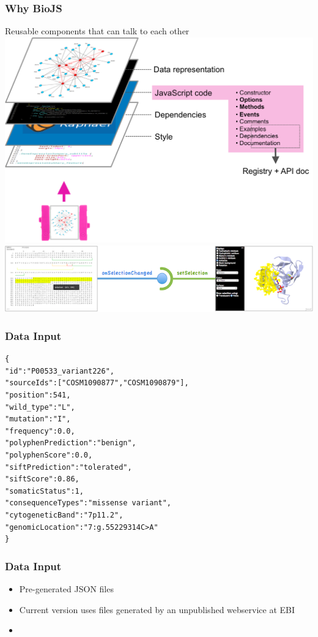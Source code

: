 \documentclass[10pt, compress]{beamer}
\renewcommand{\(}{\begin{columns}}
\renewcommand{\)}{\end{columns}}
\newcommand{\<}[1]{\begin{column}{#1}}
\renewcommand{\>}{\end{column}}
\begin{document}
\begin{frame}
\frametitle{Why BioJS}
Reusable components that can talk to each other
\includegraphics[scale=0.15]{images/biojs_component_layers}\\
\includegraphics[width=\linewidth]{images/biojs_events}
\end{frame}




\begin{frame}[fragile]
\frametitle{Data Input}
\begin{verbatim}
{
"id":"P00533_variant226",
"sourceIds":["COSM1090877","COSM1090879"],
"position":541,
"wild_type":"L",
"mutation":"I",
"frequency":0.0,
"polyphenPrediction":"benign",
"polyphenScore":0.0,
"siftPrediction":"tolerated",
"siftScore":0.86,
"somaticStatus":1,
"consequenceTypes":"missense variant",
"cytogeneticBand":"7p11.2",
"genomicLocation":"7:g.55229314C>A"
}
\end{verbatim}
\end{frame}

\begin{frame}[fragile]
\frametitle{Data Input}
\begin{itemize}
\item Pre-generated JSON files
\item Current version uses files generated by an unpublished webservice at EBI
\item 
\end{itemize}
\end{frame}
\end{document}
